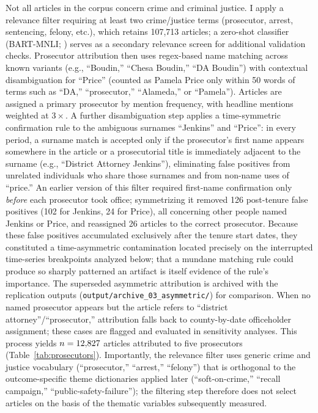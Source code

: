\documentclass[12pt, letterpaper]{article}
\begin{document}
Not all articles in the corpus concern crime and criminal justice. I apply a relevance filter requiring at least two crime/justice terms (prosecutor, arrest, sentencing, felony, etc.), which retains 107,713 articles; a zero-shot classifier (BART-MNLI; \citealt{lewis2020}) serves as a secondary relevance screen for additional validation checks. Prosecutor attribution then uses regex-based name matching across known variants (e.g., ``Boudin,'' ``Chesa Boudin,'' ``DA Boudin'') with contextual disambiguation for ``Price'' (counted as Pamela Price only within 50 words of terms such as ``DA,'' ``prosecutor,'' ``Alameda,'' or ``Pamela''). Articles are assigned a primary prosecutor by mention frequency, with headline mentions weighted at $3\times$. A further disambiguation step applies a time-symmetric confirmation rule to the ambiguous surnames ``Jenkins'' and ``Price'': in every period, a surname match is accepted only if the prosecutor's first name appears somewhere in the article or a prosecutorial title is immediately adjacent to the surname (e.g., ``District Attorney Jenkins''), eliminating false positives from unrelated individuals who share those surnames and from non-name uses of ``price.'' An earlier version of this filter required first-name confirmation only \emph{before} each prosecutor took office; symmetrizing it removed 126 post-tenure false positives (102 for Jenkins, 24 for Price), all concerning other people named Jenkins or Price, and reassigned 26 articles to the correct prosecutor. Because these false positives accumulated exclusively after the tenure start dates, they constituted a time-asymmetric contamination located precisely on the interrupted time-series breakpoints analyzed below; that a mundane matching rule could produce so sharply patterned an artifact is itself evidence of the rule's importance. The superseded asymmetric attribution is archived with the replication outputs (\texttt{output/archive\_03\_asymmetric/}) for comparison. When no named prosecutor appears but the article refers to ``district attorney''/``prosecutor,'' attribution falls back to county-by-date officeholder assignment; these cases are flagged and evaluated in sensitivity analyses. This process yields $n=12{,}827$ articles attributed to five prosecutors (Table~\ref{tab:prosecutors}). Importantly, the relevance filter uses generic crime and justice vocabulary (``prosecutor,'' ``arrest,'' ``felony'') that is orthogonal to the outcome-specific theme dictionaries applied later (``soft-on-crime,'' ``recall campaign,'' ``public-safety-failure''); the filtering step therefore does not select articles on the basis of the thematic variables subsequently measured.
\end{document}
